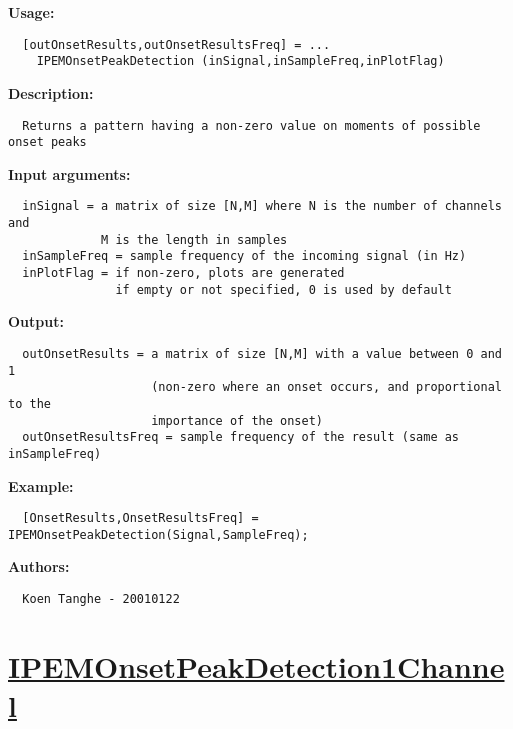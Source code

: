 \textbf{Usage:}
\begin{verbatim}  [outOnsetResults,outOnsetResultsFreq] = ...
    IPEMOnsetPeakDetection (inSignal,inSampleFreq,inPlotFlag)

\end{verbatim}
\textbf{Description:}
\begin{verbatim}  Returns a pattern having a non-zero value on moments of possible onset peaks

\end{verbatim}
\textbf{Input arguments:}
\begin{verbatim}  inSignal = a matrix of size [N,M] where N is the number of channels and
             M is the length in samples
  inSampleFreq = sample frequency of the incoming signal (in Hz)
  inPlotFlag = if non-zero, plots are generated
               if empty or not specified, 0 is used by default

\end{verbatim}
\textbf{Output:}
\begin{verbatim}  outOnsetResults = a matrix of size [N,M] with a value between 0 and 1
                    (non-zero where an onset occurs, and proportional to the 
                    importance of the onset)
  outOnsetResultsFreq = sample frequency of the result (same as inSampleFreq)

\end{verbatim}
\textbf{Example:}
\begin{verbatim}  [OnsetResults,OnsetResultsFreq] = IPEMOnsetPeakDetection(Signal,SampleFreq);

\end{verbatim}
\textbf{Authors:}
\begin{verbatim}  Koen Tanghe - 20010122
\end{verbatim}


\newpage
\section*{\hyperlink{Concepts:IPEMOnsetPeakDetection1Channel}{IPEMOnsetPeakDetection1Channel}}
\hypertarget{FuncRef:IPEMOnsetPeakDetection1Channel}{}

